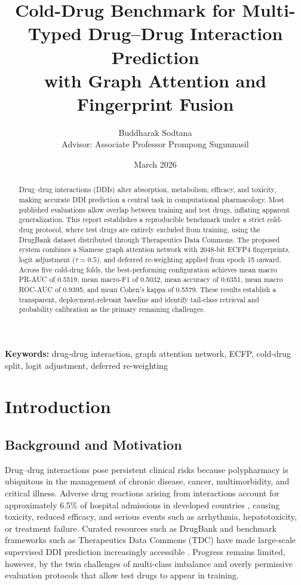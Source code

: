\documentclass[11pt,a4paper]{report}
\title{Cold-Drug Benchmark for Multi-Typed Drug--Drug Interaction Prediction\\with Graph Attention and Fingerprint Fusion}
\author{Buddharak Sodtana\\[1em]Advisor: Associate Professor Prompong Sugunnasil}
\date{March 2026}
\begin{document}
\maketitle
{}

\begin{abstract}
Drug--drug interactions (DDIs) alter absorption, metabolism, efficacy, and toxicity, making accurate DDI prediction a central task in computational pharmacology. Most published evaluations allow overlap between training and test drugs, inflating apparent generalization. This report establishes a reproducible benchmark under a strict cold-drug protocol, where test drugs are entirely excluded from training, using the DrugBank dataset distributed through Therapeutics Data Commons. The proposed system combines a Siamese graph attention network with 2048-bit ECFP4 fingerprints, logit adjustment ($\tau=0.5$), and deferred re-weighting applied from epoch 15 onward. Across five cold-drug folds, the best-performing configuration achieves mean macro PR-AUC of 0.5519, mean macro-F1 of 0.5032, mean accuracy of 0.6351, mean macro ROC-AUC of 0.9395, and mean Cohen's kappa of 0.5579. These results establish a transparent, deployment-relevant baseline and identify tail-class retrieval and probability calibration as the primary remaining challenges.
\end{abstract}

\noindent\textbf{Keywords:} drug-drug interaction, graph attention network, ECFP, cold-drug split, logit adjustment, deferred re-weighting

\tableofcontents
\clearpage
{}

\chapter{Introduction}

\section{Background and Motivation}

Drug--drug interactions pose persistent clinical risks because polypharmacy is ubiquitous in the management of chronic disease, cancer, multimorbidity, and critical illness. Adverse drug reactions arising from interactions account for approximately 6.5\% of hospital admissions in developed countries \cite{wishart2018drugbank}, causing toxicity, reduced efficacy, and serious events such as arrhythmia, hepatotoxicity, or treatment failure. Curated resources such as DrugBank and benchmark frameworks such as Therapeutics Data Commons (TDC) have made large-scale supervised DDI prediction increasingly accessible \cite{wishart2018drugbank, huang2021tdc}. Progress remains limited, however, by the twin challenges of multi-class imbalance and overly permissive evaluation protocols that allow test drugs to appear in training.
\end{document}
